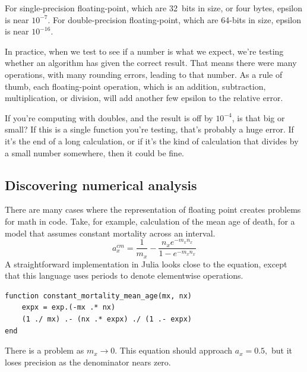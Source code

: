 \documentclass[fleqn,10pt]{olplainarticle}
\begin{document}
For single-precision floating-point, which are 32~bits in size,
or four bytes, epsilon is near $10^{-7}$. For double-precision
floating-point, which are 64-bits in size, epsilon is near
$10^{-16}$.

In practice, when we test to see if a number is what we expect,
we're testing whether an algorithm has given the correct result.
That means there were many operations, with many rounding errors,
leading to that number. As a rule of thumb, each floating-point
operation, which is an addition, subtraction, multiplication,
or division, will add another few epsilon to the relative error.

If you're computing with doubles, and the result is off by $10^{-4}$,
is that big or small? If this is a single function you're testing,
that's probably a huge error. If it's the end of a long calculation,
or if it's the kind of calculation that divides by a small number somewhere,
then it could be fine.


\subsection{Discovering numerical analysis}
There are many cases where the representation of floating point
creates problems for math in code. Take, for example, calculation
of the mean age of death, for a model that assumes constant
mortality across an interval.
\begin{equation}
  a_x^{cm} = \frac{1}{m_x} - \frac{n_x e^{-m_x n_x}}{1-e^{-m_x n_x}}
\end{equation}
A straightforward implementation in Julia looks close to the equation,
except that this language uses periods to denote elementwise
operations.
\begin{lstlisting}
function constant_mortality_mean_age(mx, nx)
    expx = exp.(-mx .* nx)
    (1 ./ mx) .- (nx .* expx) ./ (1 .- expx)
end
\end{lstlisting}
There is a problem as $m_x\rightarrow 0$. This equation should
approach $a_x=0.5,$ but it loses precision as the denominator
nears zero.
\end{document}
